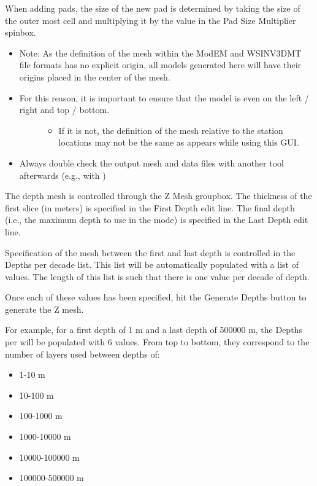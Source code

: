 \documentclass[letterpaper,10pt,english]{sphinxmanual}
\begin{document}
When adding pads, the size of the new pad is determined by taking the size of the outer most cell and multiplying it by the value in the Pad Size Multiplier spinbox.
\begin{itemize}
\item {} 
Note: As the definition of the mesh within the ModEM and WSINV3DMT file formats has no explicit origin, all models generated here will have their origins placed in the center of the mesh.

\item {} \begin{description}
\item[{For this reason, it is important to ensure that the model is even on the left / right and top / bottom.}] \leavevmode\begin{itemize}
\item {} 
If it is not, the definition of the mesh relative to the station locations may not be the same as appears while using this GUI.

\end{itemize}

\end{description}

\item {} 
Always double check the output mesh and data files with another tool afterwards (e.g., with {\hyperref[\detokenize{content/model_viewer/main_window:model-viewer}]{}})

\end{itemize}

The depth mesh is controlled through the Z Mesh groupbox.  The thickness of the first slice (in meters) is specified in the First Depth edit line. The final depth (i.e., the maximum depth to use in the mode) is specified in the Last Depth edit line.

Specification of the mesh between the first and last depth is controlled in the Depths per decade list. This list will be automatically populated with a list of values. The length of this list is such that there is one value per decade of depth.

Once each of these values has been specified, hit the Generate Depths button to generate the Z mesh.

For example, for a first depth of 1 m and a last depth of 500000 m, the Depths per will be populated with 6 values. From top to bottom, they correspond to the number of layers used between depths of:
\begin{itemize}
\item {} 
1-10 m

\item {} 
10-100 m

\item {} 
100-1000 m

\item {} 
1000-10000 m

\item {} 
10000-100000 m

\item {} 
100000-500000 m

\end{itemize}
\end{document}
